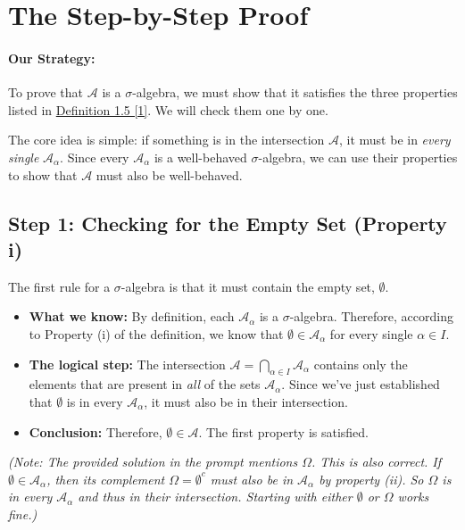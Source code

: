 \documentclass[11pt,a4paper]{article}
\theoremstyle{tutorstyle}
\begin{document}
\section{The Step-by-Step Proof}

\paragraph{Our Strategy:} To prove that $\mathcal{A}$ is a $\sigma$-algebra, we must show that it satisfies the three properties listed in \hyperlink{note1}{Definition 1.5 [1]}. We will check them one by one.

The core idea is simple: if something is in the intersection $\mathcal{A}$, it must be in \emph{every single} $\mathcal{A}_\alpha$. Since every $\mathcal{A}_\alpha$ is a well-behaved $\sigma$-algebra, we can use their properties to show that $\mathcal{A}$ must also be well-behaved.

\subsection*{Step 1: Checking for the Empty Set (Property i)}

The first rule for a $\sigma$-algebra is that it must contain the empty set, $\emptyset$.

\begin{itemize}
    \item \textbf{What we know:} By definition, each $\mathcal{A}_\alpha$ is a $\sigma$-algebra. Therefore, according to Property (i) of the definition, we know that $\emptyset \in \mathcal{A}_\alpha$ for every single $\alpha \in I$.

    \item \textbf{The logical step:} The intersection $\mathcal{A} = \bigcap_{\alpha \in I} \mathcal{A}_\alpha$ contains only the elements that are present in \emph{all} of the sets $\mathcal{A}_\alpha$. Since we've just established that $\emptyset$ is in every $\mathcal{A}_\alpha$, it must also be in their intersection.

    \item \textbf{Conclusion:} Therefore, $\emptyset \in \mathcal{A}$. The first property is satisfied.
\end{itemize}

\textit{(Note: The provided solution in the prompt mentions $\Omega$. This is also correct. If $\emptyset \in \mathcal{A}_\alpha$, then its complement $\Omega = \emptyset^c$ must also be in $\mathcal{A}_\alpha$ by property (ii). So $\Omega$ is in every $\mathcal{A}_\alpha$ and thus in their intersection. Starting with either $\emptyset$ or $\Omega$ works fine.)}
\end{document}
